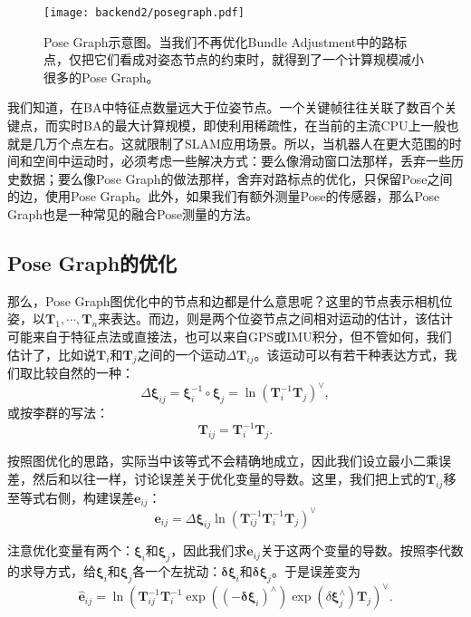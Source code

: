 \begin{figure}[!ht]
	\centering
	\texttt{[image: backend2/posegraph.pdf]}
	\caption{Pose Graph示意图。当我们不再优化Bundle Adjustment中的路标点，仅把它们看成对姿态节点的约束时，就得到了一个计算规模减小很多的Pose Graph。}
	\label{fig:pose-graph}
\end{figure}

我们知道，在BA中特征点数量远大于位姿节点。一个关键帧往往关联了数百个关键点，而实时BA的最大计算规模，即使利用稀疏性，在当前的主流CPU上一般也就是几万个点左右。这就限制了SLAM应用场景。所以，当机器人在更大范围的时间和空间中运动时，必须考虑一些解决方式：要么像滑动窗口法那样，丢弃一些历史数据\textsuperscript{\cite{Strasdat2011}}；要么像Pose Graph的做法那样，舍弃对路标点的优化，只保留Pose之间的边，使用Pose Graph\textsuperscript{\cite{Dubbelman2015, Lee2014, Latif2013}}。此外，如果我们有额外测量Pose的传感器，那么Pose Graph也是一种常见的融合Pose测量的方法。


\subsection{Pose Graph的优化}
那么，Pose Graph图优化中的节点和边都是什么意思呢？这里的节点表示相机位姿，以$\bm{T}_1, \cdots, \bm{T}_n$来表达。而边，则是两个位姿节点之间相对运动的估计，该估计可能来自于特征点法或直接法，也可以来自GPS或IMU积分，但不管如何，我们估计了，比如说$\bm{T}_i$和$\bm{T}_j$之间的一个运动$\Delta \bm{T}_{ij}$。该运动可以有若干种表达方式，我们取比较自然的一种：
\begin{equation}
\Delta \bm{\xi}_{ij} = \bm{\xi}_i^{-1} \circ \bm{\xi}_j = \ln \left( \bm{T}_i^{-1} \bm{T}_j \right)^\vee,
\end{equation}
或按李群的写法：
\begin{equation}
\bm{T}_{ij} =\bm{T}_i^{-1} \bm{T}_j.
\end{equation}

按照图优化的思路，实际当中该等式不会精确地成立，因此我们设立最小二乘误差，然后和以往一样，讨论误差关于优化变量的导数。这里，我们把上式的$\bm{T}_{ij}$移至等式右侧，构建误差$\bm{e}_{ij}$：
\begin{equation}
\bm{e}_{ij} = \Delta \bm{\xi}_{ij} \ln \left( \bm{T}_{ij}^{-1} \bm{T}_i^{-1} \bm{T}_j \right)^\vee
\end{equation}

注意优化变量有两个：$\bm{\xi}_i$和$\bm{\xi}_j$，因此我们求$\bm{e}_{ij}$关于这两个变量的导数。按照李代数的求导方式，给$\bm{\xi}_i$和$\bm{\xi}_j$各一个左扰动：$ \bm{\delta \xi}_i$和$ \bm{\delta \xi}_j$。于是误差变为
\begin{equation}
\hat{ \bm{e}}_{ij} = \ln \left( \bm{T}_{ij}^{-1}  \bm{T}_i^{-1} \exp((-\bm{\delta \xi}_i)^\wedge) \exp(\delta \bm{\xi}_j^\wedge) \bm{T}_j  \right)^\vee.
\end{equation}


